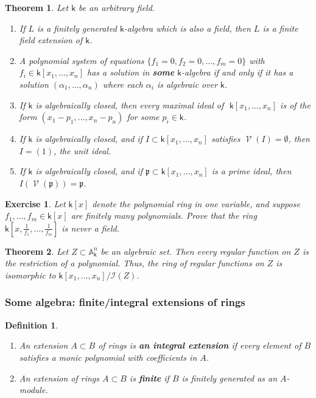 \documentclass[11pt]{article}
\newcommand{\A}{\mathbb{A}}
\newcommand{\I}{\mathcal{I}}
\renewcommand{\k}{\mathsf{k}}
\newcommand{\fp}{\mathfrak{p}}
\DeclareMathOperator{\V}{\mathcal{V}}
\newcommand{\A}{\mathbb A}
\renewcommand{\k}{\mathsf{k}}
\newtheorem{theorem}{Theorem}[section]
\newtheorem{definition}{Definition}[section]
\newtheorem{exercise}{Exercise}[section]
\begin{document}
\begin{theorem}
Let \(\k\) be an arbitrary field.

\begin{enumerate}
\item If \(L\) is a finitely generated \(\k\)-algebra which is also a field, then \(L\) is a finite field extension of \(\k\).

\item A polynomial system of equations \(\big\{f_1=0, f_2=0, \dots, f_m =0 \big\}\) with \(f_i \in \k[x_1, \dots, x_n]\) has a solution in \textbf{\emph{some}} \(\k\)-algebra if and only if it has a solution \((\alpha_1, \dots, \alpha_n)\) where each \(\alpha_i\) is algebraic over \(\k\).

\item If \(\k\) is algebraically closed, then every maximal ideal of \(\,\,\k[x_1, \dots, x_n]\) is of the form \((x_1-p_1, \dots, x_n-p_n)\) for some \(p_i \in \k\).

\item If \(\k\) is algebraically closed, and if \(I \subset \k[x_1, \dots, x_n]\) satisfies \(\V(I) = \emptyset\), then \(I = (1)\), the unit ideal.
\item If \(\k\) is algebraically closed, and if \(\fp \subset \k[x_1, \dots, x_n]\) is a prime ideal, then \(I(\V(\fp)) = \fp\).
\end{enumerate}
\end{theorem}


\begin{exercise}
Let \(\k[x]\) denote the polynomial ring in one variable, and suppose \(f_1, \dots, f_m \in \k[x]\) are finitely many polynomials.  Prove that the ring \(\k[x, \frac{1}{f_1}, \dots, \frac{1}{f_m}]\) is never a field. 
\end{exercise}

\begin{theorem}
Let \(Z \subset \A^n_{\k}\) be an algebraic set. Then every regular function on \(Z\) is the restriction of a polynomial.  Thus, the ring of regular functions on \(Z\) is isomorphic to \(\k[x_1, \dots, x_n]/\I(Z)\). 
\end{theorem}


\subsubsection{Some  algebra: finite/integral extensions of rings}
\label{sec:org00a2814}

\begin{definition}
\begin{enumerate}
\item An extension \(A \subset B\) of rings is \textbf{\emph{an integral extension}} if every element of \(B\) satisfies a monic polynomial with coefficients in \(A\).

\item An extension of rings \(A \subset B\) is \textbf{\emph{finite}} if \(B\) is finitely generated as an \(A\)-module.
\end{enumerate}
\end{definition}
\end{document}

